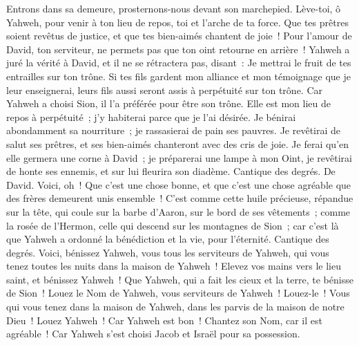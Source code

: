 \begin{multicols}{2}
Entrons dans sa demeure, prosternons-nous devant son marchepied.
Lève-toi, ô Yahweh, pour venir à ton lieu de repos, toi et l'arche de ta force.
Que tes prêtres soient revêtus de justice, et que tes bien-aimés chantent de joie~!
Pour l'amour de David, ton serviteur, ne permets pas que ton oint retourne en arrière~!
Yahweh a juré la vérité à David, et il ne se rétractera pas, disant~: Je mettrai le fruit de tes entrailles sur ton trône.
Si tes fils gardent mon alliance et mon témoignage que je leur enseignerai, leurs fils aussi seront assis à perpétuité sur ton trône.
Car Yahweh a choisi Sion, il l'a préférée pour être son trône.
Elle est mon lieu de repos à perpétuité~; j'y habiterai parce que je l'ai désirée.
Je bénirai abondamment sa nourriture~; je rassasierai de pain ses pauvres.
Je revêtirai de salut ses prêtres, et ses bien-aimés chanteront avec des cris de joie.
Je ferai qu'en elle germera une corne à David~; je préparerai une lampe à mon Oint,
je revêtirai de honte ses ennemis, et sur lui fleurira son diadème.
\VerseOne{}Cantique des degrés. De David. Voici, oh~! Que c'est une chose bonne, et que c'est une chose agréable que des frères demeurent unis ensemble~!
C'est comme cette huile précieuse, répandue sur la tête, qui coule sur la barbe d'Aaron, sur le bord de ses vêtements~;
comme la rosée de l'Hermon, celle qui descend sur les montagnes de Sion~; car c'est là que Yahweh a ordonné la bénédiction et la vie, pour l'éternité.
\VerseOne{}Cantique des degrés. Voici, bénissez Yahweh, vous tous les serviteurs de Yahweh, qui vous tenez toutes les nuits dans la maison de Yahweh~!
Elevez vos mains vers le lieu saint, et bénissez Yahweh~!
Que Yahweh, qui a fait les cieux et la terre, te bénisse de Sion~!
\VerseOne{}Louez le Nom de Yahweh, vous serviteurs de Yahweh~! Louez-le~!
Vous qui vous tenez dans la maison de Yahweh, dans les parvis de la maison de notre Dieu~!
Louez Yahweh~! Car Yahweh est bon~! Chantez son Nom, car il est agréable~!
Car Yahweh s'est choisi Jacob et Israël pour sa possession.

\end{multicols}
